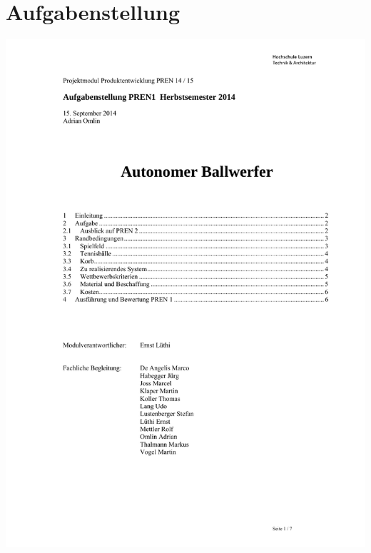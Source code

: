 

\newcommand{\myTitel}{Anhang zur Dokumentation}

    
    
    \renewcommand{\contentsname}{Inhalt}
    \tableofcontents
    \newpage
    


     \section{Aufgabenstellung}
	     \includegraphics[page=1,scale=0.86,clip,trim=33mm 40mm 20mm 30mm] {Enddokumentation/Anhang/Extern/Aufgabenstellung_PREN1_H14.pdf}
